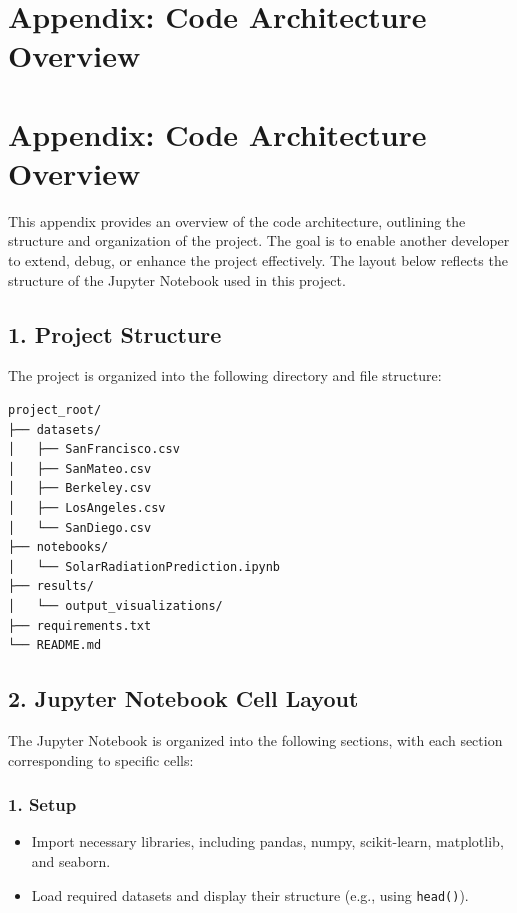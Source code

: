 \documentclass[10pt,twocolumn]{article}
\begin{document}
\begin{itemize}
\newpage

\section*{Appendix: Code Architecture Overview}


\section*{Appendix: Code Architecture Overview}

This appendix provides an overview of the code architecture, outlining the structure and organization of the project. The goal is to enable another developer to extend, debug, or enhance the project effectively. The layout below reflects the structure of the Jupyter Notebook used in this project.

\subsection*{1. Project Structure}
The project is organized into the following directory and file structure:
\begin{verbatim}
project_root/
├── datasets/
│   ├── SanFrancisco.csv
│   ├── SanMateo.csv
│   ├── Berkeley.csv
│   ├── LosAngeles.csv
│   └── SanDiego.csv
├── notebooks/
│   └── SolarRadiationPrediction.ipynb
├── results/
│   └── output_visualizations/
├── requirements.txt
└── README.md
\end{verbatim}

\subsection*{2. Jupyter Notebook Cell Layout}
The Jupyter Notebook is organized into the following sections, with each section corresponding to specific cells:

\subsubsection*{1. Setup}
\begin{itemize}
    \item Import necessary libraries, including pandas, numpy, scikit-learn, matplotlib, and seaborn.
    \item Load required datasets and display their structure (e.g., using \texttt{head()}).
\end{itemize}


\end{itemize}
\end{document}
